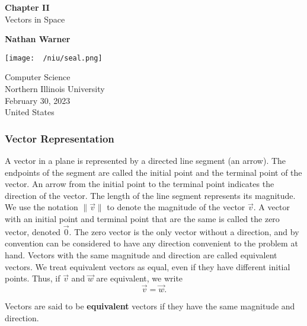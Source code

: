 \documentclass{report}
\title{\Huge{}}
\author{\huge{Nathan Warner}}
\date{\huge{}}
\begin{document}
        \begin{titlepage}
       \begin{center}
           \vspace*{1cm}
    
           \textbf{Chapter II} \\
           Vectors in Space
    
           \vspace{0.5cm}
            
                
           \vspace{1.5cm}
    
           \textbf{Nathan Warner}
    
           \vfill
                
           \vspace{0.8cm}
         
           \texttt{[image: ~/niu/seal.png]}
                
           Computer Science \\
           Northern Illinois University\\
           February 30, 2023 \\
           United States\\
           
                
       \end{center}
    \end{titlepage}
    \tableofcontents
    \pagebreak \bigbreak \noindent 

    \bigbreak \noindent 
    \bigbreak \noindent 
    \subsubsection{Vector Representation}
    \bigbreak \noindent 
    A vector in a plane is represented by a directed line segment (an arrow). The endpoints of the segment are called the initial point and the terminal point of the vector. An arrow from the initial point to the terminal point indicates the direction of the vector. The length of the line segment represents its magnitude. We use the notation $\lVert \vec{v} \rVert$ to denote the magnitude of the vector $\vec{v}$. A vector with an initial point and terminal point that are the same is called the zero vector, denoted $\vec{0}$. The zero vector is the only vector without a direction, and by convention can be considered to have any direction convenient to the problem at hand.
    Vectors with the same magnitude and direction are called equivalent vectors. We treat equivalent vectors as equal, even if they have different initial points. Thus, if $\vec{v}$ and $\vec{w}$ are equivalent, we write
    \[
    \vec{v} = \vec{w}.
    \]
    \bigbreak \noindent 
    \begin{dfn}
        Vectors are said to be \textbf{equivalent} vectors if they have the same magnitude and direction. 
    \end{dfn}
\end{document}
